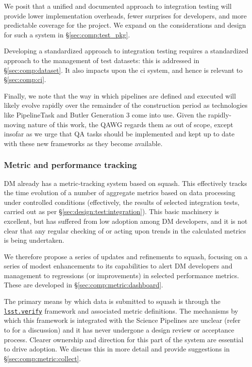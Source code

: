 We posit that a unified and documented approach to integration testing will
provide lower implementation overheads, fewer surprises for developers, and
more predictable coverage for the project. We expand on the considerations and
design for such a system in \S\ref{sec:comp:test_pkg}.

Developing a standardized approach to integration testing requires a
standardized approach to the management of test datasets: this is addressed in
\S\ref{sec:comp:dataset}. It also impacts upon the \gls{ci} system, and hence
is relevant to \S\ref{sec:comp:ci}.

Finally, we note that the way in which pipelines are defined and executed will
likely evolve rapidly over the remainder of the construction period as
technologies like PipelineTask and Butler Generation 3 come into use. Given
the rapidly-moving nature of this work, the QAWG regards them as out of scope,
except insofar as we urge that QA tasks should be implemented and kept up to
date with these new frameworks as they become available.

\subsubsection{Metric and performance tracking}
\label{sec:design:test:metrics}

DM already has a metric-tracking system based on \gls{squash}. This
effectively tracks the time evolution of a number of \glspl{aggregate metric}
based on data processing under controlled conditions (effectively, the results
of selected integration tests, carried out as per
\S\ref{sec:design:test:integration}). This basic machinery is excellent, but
has suffered from low adoption among DM developers, and it is not clear that
any regular checking of or acting upon trends in the calculated metrics is
being undertaken.

We therefore propose a series of updates and refinements to \gls{squash},
focusing on a series of modest enhancements to its capabilities to alert DM
developers and management to regressions (or improvements) in selected
performance metrics. These are developed in \S\ref{sec:comp:metric:dashboard}.

The primary means by which data is submitted to \gls{squash} is through the
\href{https://github.com/lsst/verify}{\texttt{lsst.verify}} framework and
associated metric definitions. The mechanisms by which this framework is
integrated with the Science Pipelines are unclear (refer to 
for a discussion) and it has never undergone a design review or acceptance
process.  Clearer ownership and direction for this part of the system are
essential to drive adoption. We discuss this in more detail and provide
suggestions in \S\ref{sec:comp:metric:collect}.
